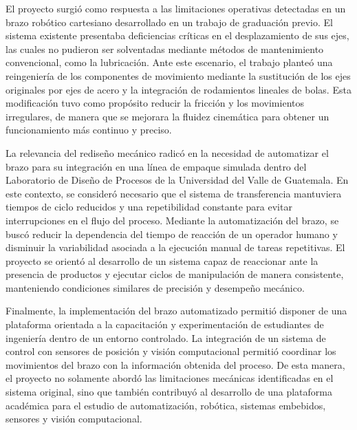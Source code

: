 El proyecto surgió como respuesta a las limitaciones operativas detectadas en un brazo robótico cartesiano desarrollado en un trabajo de graduación previo. El sistema existente presentaba deficiencias críticas en el desplazamiento de sus ejes, las cuales no pudieron ser solventadas mediante métodos de mantenimiento convencional, como la lubricación. Ante este escenario, el trabajo planteó una reingeniería de los componentes de movimiento mediante la sustitución de los ejes originales por ejes de acero y la integración de rodamientos lineales de bolas. Esta modificación tuvo como propósito reducir la fricción y los movimientos irregulares, de manera que se mejorara la fluidez cinemática para obtener un funcionamiento más continuo y preciso.

La relevancia del rediseño mecánico radicó en la necesidad de automatizar el brazo para su integración en una línea de empaque simulada dentro del Laboratorio de Diseño de Procesos de la Universidad del Valle de Guatemala. En este contexto, se consideró necesario que el sistema de transferencia mantuviera tiempos de ciclo reducidos y una repetibilidad constante para evitar interrupciones en el flujo del proceso. Mediante la automatización del brazo, se buscó reducir la dependencia del tiempo de reacción de un operador humano y disminuir la variabilidad asociada a la ejecución manual de tareas repetitivas. El proyecto se orientó al desarrollo de un sistema capaz de reaccionar ante la presencia de productos y ejecutar ciclos de manipulación de manera consistente, manteniendo condiciones similares de precisión y desempeño mecánico.

Finalmente, la implementación del brazo automatizado permitió disponer de una plataforma orientada a la capacitación y experimentación de estudiantes de ingeniería dentro de un entorno controlado. La integración de un sistema de control con sensores de posición y visión computacional permitió coordinar los movimientos del brazo con la información obtenida del proceso. De esta manera, el proyecto no solamente abordó las limitaciones mecánicas identificadas en el sistema original, sino que también contribuyó al desarrollo de una plataforma académica para el estudio de automatización, robótica, sistemas embebidos, sensores y visión computacional.